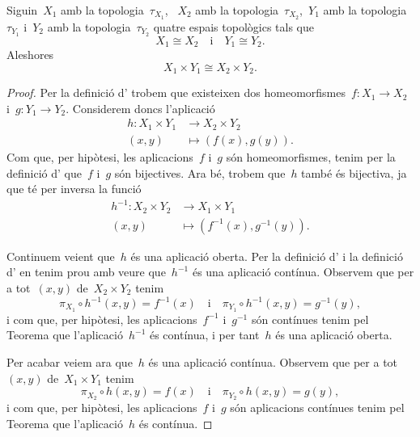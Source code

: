 \documentclass[../../main.tex]{subfiles}
\begin{document}
    \begin{proposition}
        \label{prop:si dues parelles d'espais topològics són homeomorfs els seus productes cartesians també ho són}
        Siguin~\(X_{1}\) amb la topologia~\(\tau_{X_{1}}\), ~\(X_{2}\) amb la topologia~\(\tau_{X_{2}}\),~\(Y_{1}\) amb la topologia~\(\tau_{Y_{1}}\) i~\(Y_{2}\) amb la topologia~\(\tau_{Y_{2}}\) quatre espais topològics tals que
        \[
            X_{1}\cong X_{2}\quad\text{i}\quad Y_{1}\cong Y_{2}.
        \]
        Aleshores
        \[
            X_{1}\times Y_{1}\cong X_{2}\times Y_{2}.
        \]
        \begin{proof}
            Per la definició d' trobem que existeixen dos homeomorfismes~\(f\colon X_{1}\longrightarrow X_{2}\) i~\(g\colon Y_{1}\longrightarrow Y_{2}\).
            Considerem doncs l'aplicació
            \begin{align*}
                h\colon X_{1}\times Y_{1}&\longrightarrow X_{2}\times Y_{2} \\
                (x,y)&\longmapsto(f(x),g(y)).
            \end{align*}
            Com que, per hipòtesi, les aplicacions~\(f\) i~\(g\) són homeomorfismes, tenim per la definició d' que~\(f\) i~\(g\) són bijectives.
            Ara bé, trobem que~\(h\) també és bijectiva, ja que té per inversa la funció
            \begin{align*}
                h^{-1}\colon X_{2}\times Y_{2}&\longrightarrow X_{1}\times Y_{1} \\
                (x,y)&\longmapsto(f^{-1}(x),g^{-1}(y)).
            \end{align*}

            Continuem veient que~\(h\) és una aplicació oberta.
            Per la definició d' i la definició d' en tenim prou amb veure que~\(h^{-1}\) és una aplicació contínua.
            Observem que per a tot~\((x,y)\) de~\(X_{2}\times Y_{2}\) tenim
            \[
                \pi_{X_{1}}\circ h^{-1}(x,y)=f^{-1}(x)\quad\text{i}\quad\pi_{Y_{1}}\circ h^{-1}(x,y)=g^{-1}(y),
            \]
            i com que, per hipòtesi, les aplicacions~\(f^{-1}\) i~\(g^{-1}\) són contínues tenim pel Teorema  que l'aplicació~\(h^{-1}\) és contínua, i per tant~\(h\) és una aplicació oberta.

            Per acabar veiem ara que~\(h\) és una aplicació contínua.
            Observem que per a tot~\((x,y)\) de~\(X_{1}\times Y_{1}\) tenim
            \[
                \pi_{X_{2}}\circ h(x,y)=f(x)\quad\text{i}\quad\pi_{Y_{2}}\circ h(x,y)=g(y),
            \]
            i com que, per hipòtesi, les aplicacions~\(f\) i~\(g\) són aplicacions contínues tenim pel Teorema  que l'aplicació~\(h\) és contínua.


\end{proof}
\end{proposition}
\end{document}
